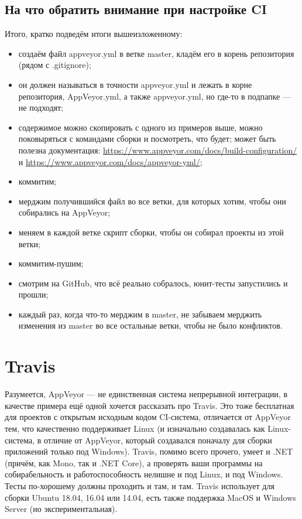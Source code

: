 \documentclass[a5paper]{article}
\begin{document}
\subsection{На что обратить внимание при настройке CI}

Итого, кратко подведём итоги вышеизложенному:

\begin{itemize}
    \item создаём файл appveyor.yml в ветке master, кладём его в корень репозитория (рядом с .gitignore);
    \item он должен называться в точности appveyor.yml и лежать в корне репозитория, AppVeyor.yml, а также appveyor.yml, но где-то в подпапке --- не подходят;
    \item содержимое можно скопировать с одного из примеров выше, можно поковыряться с командами сборки и посмотреть, что будет; может быть полезна документация: \url{https://www.appveyor.com/docs/build-configuration/} и \url{https://www.appveyor.com/docs/appveyor-yml/};
    \item коммитим;
    \item мерджим получившийся файл во все ветки, для которых хотим, чтобы они собирались на AppVeyor;
    \item меняем в каждой ветке скрипт сборки, чтобы он собирал проекты из этой ветки;
    \item коммитим-пушим;
    \item смотрим на GitHub, что всё реально собралось, юнит-тесты запустились и прошли;
    \item каждый раз, когда что-то мерджим в master, не забываем мерджить изменения из master во все остальные ветки, чтобы не было конфликтов.
\end{itemize}

\section{Travis}

Разумеется, AppVeyor --- не единственная система непрерывной интеграции, в качестве примера ещё одной хочется рассказать про Travis. Это тоже бесплатная для проектов с открытым исходным кодом CI-система, отличается от AppVeyor тем, что качественно поддерживает Linux (и изначально создавалась как Linux-система, в отличие от AppVeyor, который создавался поначалу для сборки приложений только под Windows). Travis, помимо всего прочего, умеет и .NET (причём, как Mono, так и .NET Core), а проверять ваши программы на собирабельность и работоспособность нелишне и под Linux, и под Windows. Тесты по-хорошему должны проходить и там, и там. Travis использует для сборки Ubuntu 18.04, 16.04 или 14.04, есть также поддержка MacOS и Windows Server (но экспериментальная).
\end{document}
